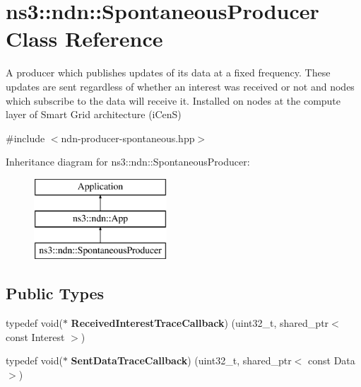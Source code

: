 \hypertarget{classns3_1_1ndn_1_1SpontaneousProducer}{}\section{ns3\+:\+:ndn\+:\+:Spontaneous\+Producer Class Reference}
\label{classns3_1_1ndn_1_1SpontaneousProducer}


A producer which publishes updates of its data at a fixed frequency. These updates are sent regardless of whether an interest was received or not and nodes which subscribe to the data will receive it. Installed on nodes at the compute layer of Smart Grid architecture (i\+CenS)  




{\ttfamily \#include $<$ndn-\/producer-\/spontaneous.\+hpp$>$}

Inheritance diagram for ns3\+:\+:ndn\+:\+:Spontaneous\+Producer\+:\begin{figure}[H]
\begin{center}
\leavevmode
\includegraphics[height=3.000000cm]{classns3_1_1ndn_1_1SpontaneousProducer}
\end{center}
\end{figure}
\subsection*{Public Types}
\begin{DoxyCompactItemize}
\item 
typedef void($\ast$ {\bfseries Received\+Interest\+Trace\+Callback}) (uint32\+\_\+t, shared\+\_\+ptr$<$ const Interest $>$)\hypertarget{classns3_1_1ndn_1_1SpontaneousProducer_ae3605c9f1c972660c3eb69fc8fc03faf}{}\label{classns3_1_1ndn_1_1SpontaneousProducer_ae3605c9f1c972660c3eb69fc8fc03faf}

\item 
typedef void($\ast$ {\bfseries Sent\+Data\+Trace\+Callback}) (uint32\+\_\+t, shared\+\_\+ptr$<$ const Data $>$)\hypertarget{classns3_1_1ndn_1_1SpontaneousProducer_a9a5c053228a56a06e9cf5a90086b19a6}{}\label{classns3_1_1ndn_1_1SpontaneousProducer_a9a5c053228a56a06e9cf5a90086b19a6}

\end{DoxyCompactItemize}
